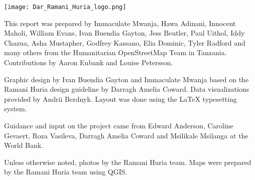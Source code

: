 \documentclass[a4paper,12pt,twoside]{article}
\begin{document}

%  
  

  

\newpage
\color{RHgrey}

\begin{center}
{\texttt{[image: Dar\_Ramani\_Huria\_logo.png]}}
\end{center}

This report was prepared by Immaculate Mwanja, Hawa Adinani, Innocent Maholi, William Evans, Ivan Buendia Gayton, Jess Beutler, Paul Uithol, Iddy Chazua, Asha Mustapher, Godfrey Kassano, Elia Dominic, Tyler Radford and many others from the Humanitarian OpenStreetMap Team in Tanzania. Contributions by Aaron Eubank and Louise Petersson.

Graphic design by Ivan Buendia Gayton and Immaculate Mwanja based on the Ramani Huria design guideline by Darragh Amelia Coward. Data visualizations provided by 
Andrii Berdnyk. Layout was done using the \LaTeX{} typesetting system.

Guidance and input on the project came from Edward Anderson, Caroline Gevaert, Roza Vasileva, Darragh Amelia Coward and Msilikale Msilanga at the World Bank.

Unless otherwise noted, photos by the Ramani Huria team. Maps were prepared by the Ramani Huria team using QGIS.



\bigskip\bigskip\bigskip
\end{document}
